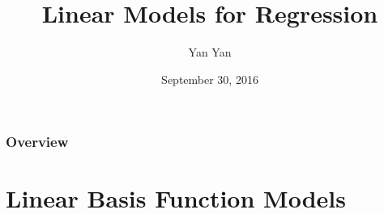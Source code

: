 \documentclass{beamer}
\title[ ]{Linear Models for Regression} %
\author{Yan Yan} %
\institute[SIAT] %
{
Shenzhen Institute of Advanced Technology\\
Chinese Academy of Sciences \\ %
\medskip
{yan.yan@siat.ac.cn} %
}
\date{September 30, 2016} %
\begin{document}
\begin{frame}
\titlepage %
\end{frame}

\begin{frame}
\frametitle{Overview} %
\tableofcontents %
\end{frame}


\section{Linear Basis Function Models} %

\end{document}
